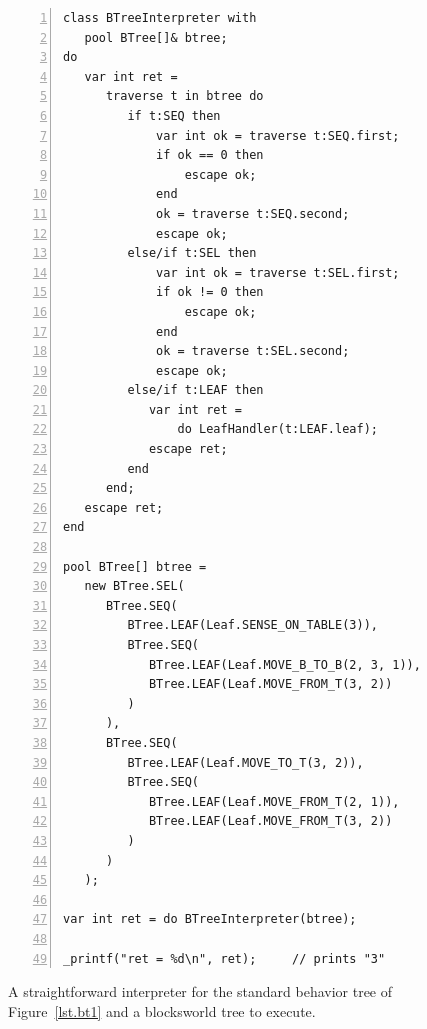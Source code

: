 \documentclass{sig-alternate}
\begin{document}
\begin{figure}%
\begin{lstlisting}[numbers=left,xleftmargin=3em]
class BTreeInterpreter with
   pool BTree[]& btree;
do
   var int ret =
      traverse t in btree do
         if t:SEQ then
             var int ok = traverse t:SEQ.first;
             if ok == 0 then
                 escape ok;
             end
             ok = traverse t:SEQ.second;
             escape ok;
         else/if t:SEL then
             var int ok = traverse t:SEL.first;
             if ok != 0 then
                 escape ok;
             end
             ok = traverse t:SEL.second;
             escape ok;
         else/if t:LEAF then
            var int ret =
                do LeafHandler(t:LEAF.leaf);
            escape ret;
         end
      end;
   escape ret;
end

pool BTree[] btree =
   new BTree.SEL(
      BTree.SEQ(
         BTree.LEAF(Leaf.SENSE_ON_TABLE(3)),
         BTree.SEQ(
            BTree.LEAF(Leaf.MOVE_B_TO_B(2, 3, 1)),
            BTree.LEAF(Leaf.MOVE_FROM_T(3, 2))
         )
      ),
      BTree.SEQ(
         BTree.LEAF(Leaf.MOVE_TO_T(3, 2)),
         BTree.SEQ(
            BTree.LEAF(Leaf.MOVE_FROM_T(2, 1)),
            BTree.LEAF(Leaf.MOVE_FROM_T(3, 2))
         )
      )
   );

var int ret = do BTreeInterpreter(btree);

_printf("ret = %d\n", ret);     // prints "3"
\end{lstlisting}
\caption{ A straightforward interpreter for the standard behavior tree of 
          Figure~\ref{lst.bt1} and a blocksworld tree to execute.
\label{lst.bt1.interpreter}
}
\end{figure}


\end{document}
